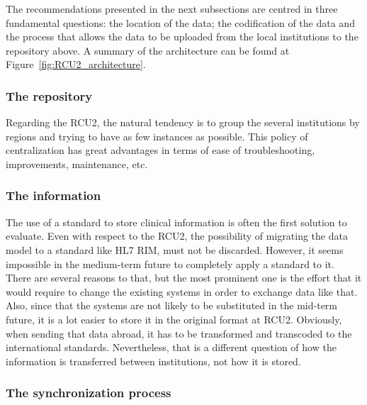 The recommendations presented in the next subsections are centred in three fundamental questions: the location of the data; the codification of the data and the process that allows the data to be uploaded from the local institutions to the repository above. A summary of the architecture can be found at Figure~\ref{fig:RCU2_architecture}.


\subsubsection{The repository}

Regarding the RCU2, the natural tendency is to group the several institutions by regions and trying to have as few instances as possible. This policy of centralization has great advantages in terms of ease of troubleshooting, improvements, maintenance, etc. 


\subsubsection{The information}

The use of a standard to store clinical information is often the first solution to evaluate. Even with respect to the RCU2, the possibility of migrating the data model to a standard like HL7 RIM, must not be discarded. However, it seems impossible in the medium-term future to completely apply a standard to it. There are several reasons to that, but the most prominent one is the effort that it would require to change the existing systems in order to exchange data like that.
Also, since that the systems are not likely to be substituted in the mid-term future, it is a lot easier to store it in the original format at RCU2. Obviously, when sending that data abroad, it has to be transformed and transcoded to the international standards. Nevertheless, that is a different question of how the information is transferred between institutions, not how it is stored. 


\subsubsection{The synchronization process}

